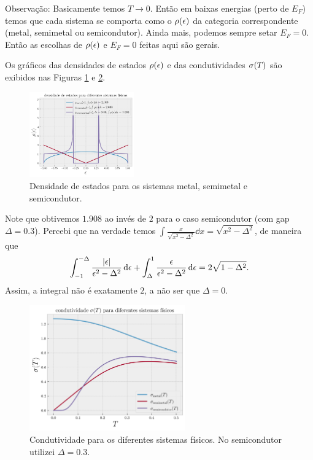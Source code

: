 \documentclass[a4paper,10pt]{article}
\begin{document}
Observação: Basicamente temos $T \to 0$. Então em baixas energias (perto de $E_F$) temos que cada sistema se comporta como o $\rho(\epsilon)$ da categoria correspondente (metal, semimetal ou semicondutor). Ainda mais, podemos sempre setar $E_F = 0$. Então as escolhas de $\rho(\epsilon)$ e $E_F = 0$ feitas aqui são gerais.

Os gráficos das densidades de estados $\rho(\epsilon)$ e das condutividades $\sigma(T)$ são exibidos nas Figuras \ref{fig:dos-systems} e \ref{fig:sigma}.

\begin{figure}[H]
\centering
\includegraphics[width=0.4\textwidth]{fig/dos-systems.png}
\caption{Densidade de estados para os sistemas metal, semimetal e semicondutor.}
\label{fig:dos-systems}
\end{figure}
Note que obtivemos $1.908$ ao invés de $2$ para o caso semicondutor (com gap $\Delta = 0.3$). Percebi que na verdade temos $\int \frac{x}{\sqrt{x^2-\Delta^2}} \dd{x} = \sqrt{x^2 - \Delta^2}$, de maneira que
$$
\int_{-1}^{-\Delta} \frac{\abs{\epsilon}}{\epsilon^2-\Delta^2} \dd{\epsilon} + \int_{\Delta}^{1} \frac{\epsilon}{\epsilon^2-\Delta^2} \dd{\epsilon} = 2 \sqrt{1-\Delta^2}.
$$
Assim, a integral não é exatamente $2$, a não ser que $\Delta = 0$.

\begin{figure}[H]
\centering
\includegraphics[width=0.6\textwidth]{fig/sigma.png}
\caption{Condutividade para os diferentes sistemas físicos. No semicondutor utilizei $\Delta = 0.3$.}
\label{fig:sigma}
\end{figure}
\end{document}
